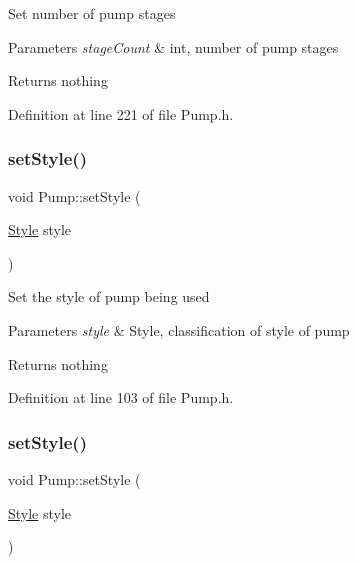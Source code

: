 Set number of pump stages


\begin{DoxyParams}{Parameters}
{\em stage\+Count} & int, number of pump stages\\
\hline
\end{DoxyParams}
\begin{DoxyReturn}{Returns}
nothing 
\end{DoxyReturn}


Definition at line 221 of file Pump.\+h.

\mbox{\label{class_pump_a4852cb47f40a46ba84c7dff91d1abd53}} 
\subsubsection{\texorpdfstring{set\+Style()}{setStyle()}\hspace{0.1cm}{\footnotesize\ttfamily [1/3]}}
{\footnotesize\ttfamily void Pump\+::set\+Style (\begin{DoxyParamCaption}\item[{\hyperlink{class_pump_aef354601ce4218258cc898b35a1e90ff}{Style}}]{style }\end{DoxyParamCaption})\hspace{0.3cm}{\ttfamily [inline]}}

Set the style of pump being used


\begin{DoxyParams}{Parameters}
{\em style} & Style, classification of style of pump\\
\hline
\end{DoxyParams}
\begin{DoxyReturn}{Returns}
nothing 
\end{DoxyReturn}


Definition at line 103 of file Pump.\+h.

\mbox{\label{class_pump_a4852cb47f40a46ba84c7dff91d1abd53}} 
\subsubsection{\texorpdfstring{set\+Style()}{setStyle()}\hspace{0.1cm}{\footnotesize\ttfamily [2/3]}}
{\footnotesize\ttfamily void Pump\+::set\+Style (\begin{DoxyParamCaption}\item[{\hyperlink{class_pump_aef354601ce4218258cc898b35a1e90ff}{Style}}]{style }\end{DoxyParamCaption})\hspace{0.3cm}{\ttfamily [inline]}}

